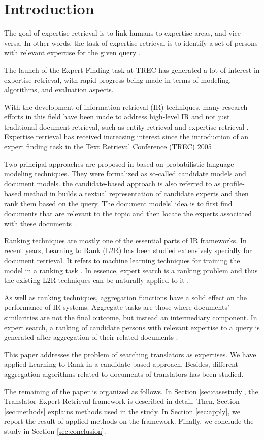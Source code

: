 \section{Introduction}
\label{sec:introduction}
The goal of expertise retrieval is to link humans to expertise areas, and vice versa. In other words, the task of expertise retrieval is to identify a set of persons with relevant expertise for the given query \cite{er} \cite{er-community-aware}.

The launch of the Expert Finding task at TREC has generated a lot of interest in expertise retrieval, with rapid progress being made in terms of modeling, algorithms, and evaluation aspects.

With the development of information retrieval (IR) techniques, many research efforts in this field have been made to address high-level IR and not just traditional document retrieval, such as entity retrieval and expertise retrieval \citep{er-sparse}. Expertise retrieval has received increasing interest since the introduction of an expert finding task in the Text Retrieval Conference (TREC) 2005 \cite{trec2005} \cite{er-community-aware}.

Two principal approaches are proposed in \cite{trec2005} based on probabilistic language modeling techniques. They were formalized as so-called candidate models and document models. the candidate-based approach is also referred to as
profile-based method in builds a textual representation of candidate experts and then rank them based on the query. The document models' idea is to first find documents that are relevant to the topic and then locate the experts associated with these documents \cite{er}.

Ranking techniques are mostly one of the essential parts of IR frameworks. In recent years, Learning to Rank (L2R) has been studied extensively specially for document retrieval. It refers to machine learning techniques for training the model in a ranking task \cite{er}. In essence, expert search is a ranking problem and thus the existing L2R techniques can be naturally applied to it \cite{l2r-intro}.

As well as ranking techniques, aggregation functions have a solid effect on the performance of IR systems. Aggregate tasks are those where documents' similarities are not
the final outcome, but instead an intermediary component. In expert search, a ranking of candidate persons with relevant expertise to a query is generated after aggregation of their related documents \citep{agg-learning}.

This paper addresses the problem of searching translators as expertises. We have applied Learning to Rank in a candidate-based approach. Besides, different aggregation algorithms related to documents of translators has been studied.

The remaining of the paper is organized as follows. In Section \ref{sec:casestudy}, the Translator-Expert Retrieval framework is described in detail. Then, Section \ref{sec:methods} explains methods used in the study. In Section \ref{sec:apply}, we report the result of applied methods on the framework. Finally, we conclude the study in Section \ref{sec:conclusion}.
